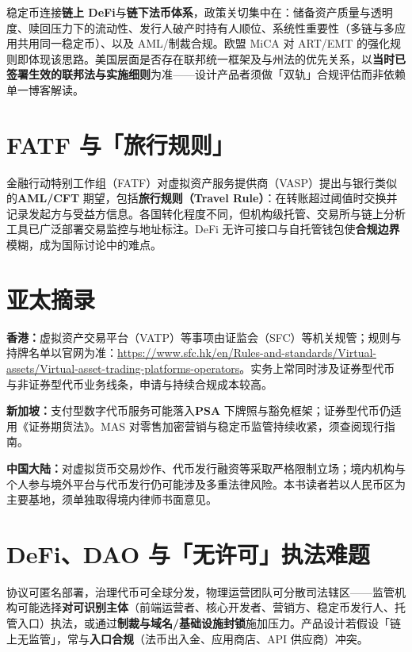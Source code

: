 稳定币连接\textbf{链上 DeFi}与\textbf{链下法币体系}，政策关切集中在：储备资产质量与透明度、赎回压力下的流动性、发行人破产时持有人顺位、系统性重要性（多链与多应用共用同一稳定币）、以及 AML/制裁合规。欧盟 MiCA 对 ART/EMT 的强化规则即体现该思路。美国层面是否存在联邦统一框架及与州法的优先关系，以\textbf{当时已签署生效的联邦法与实施细则}为准——设计产品者须做「双轨」合规评估而非依赖单一博客解读。

\section{FATF 与「旅行规则」}

金融行动特别工作组（FATF）对虚拟资产服务提供商（VASP）提出与银行类似的\textbf{AML/CFT} 期望，包括\textbf{旅行规则（Travel Rule）}：在转账超过阈值时交换并记录发起方与受益方信息。各国转化程度不同，但机构级托管、交易所与链上分析工具已广泛部署交易监控与地址标注。DeFi 无许可接口与自托管钱包使\textbf{合规边界}模糊，成为国际讨论中的难点。

\section{亚太摘录}

\textbf{香港：}虚拟资产交易平台（VATP）等事项由证监会（SFC）等机关规管；规则与持牌名单以官网为准：\url{https://www.sfc.hk/en/Rules-and-standards/Virtual-assets/Virtual-asset-trading-platforms-operators}。实务上常同时涉及证券型代币与非证券型代币业务线条，申请与持续合规成本较高。

\textbf{新加坡：}支付型数字代币服务可能落入\textbf{PSA} 下牌照与豁免框架；证券型代币仍适用《证券期货法》。MAS 对零售加密营销与稳定币监管持续收紧，须查阅现行指南。

\textbf{中国大陆：}对虚拟货币交易炒作、代币发行融资等采取严格限制立场；境内机构与个人参与境外平台与代币发行仍可能涉及多重法律风险。本书读者若以人民币区为主要基地，须单独取得境内律师书面意见。

\section{DeFi、DAO 与「无许可」执法难题}

协议可匿名部署，治理代币可全球分发，物理运营团队可分散司法辖区——监管机构可能选择\textbf{对可识别主体}（前端运营者、核心开发者、营销方、稳定币发行人、托管入口）执法，或通过\textbf{制裁与域名/基础设施封锁}施加压力。产品设计若假设「链上无监管」，常与\textbf{入口合规}（法币出入金、应用商店、API 供应商）冲突。

